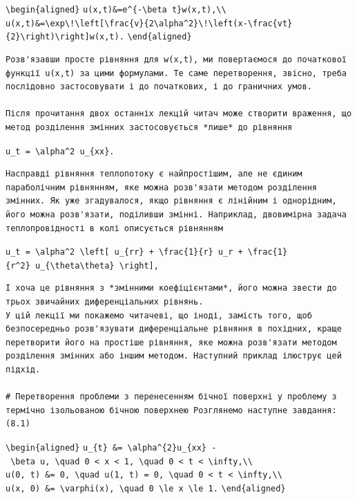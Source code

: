\documentclass[
  ukrainian,
]{article}
\begin{document}
\texttt{\textbackslash{}begin\{aligned\}}
\texttt{u(x,t)\&=e\^{}\{-\textbackslash{}beta\ t\}w(x,t),\textbackslash{}\textbackslash{}}
\texttt{u(x,t)\&=\textbackslash{}exp\textbackslash{}!\textbackslash{}left{[}\textbackslash{}frac\{v\}\{2\textbackslash{}alpha\^{}2\}\textbackslash{}!\textbackslash{}left(x-\textbackslash{}frac\{vt\}\{2\}\textbackslash{}right)\textbackslash{}right{]}w(x,t).}
\texttt{\textbackslash{}end\{aligned\}}

\begin{verbatim}
Розв'язавши просте рівняння для w(x,t), ми повертаємося до початкової функції u(x,t) за цими формулами. Те саме перетворення, звісно, треба послідовно застосовувати і до початкових, і до граничних умов.

Після прочитання двох останніх лекцій читач може створити враження, що метод розділення змінних застосовується *лише* до рівняння
\end{verbatim}

\texttt{u\_t\ =\ \textbackslash{}alpha\^{}2\ u\_\{xx\}.}

\begin{verbatim}
Насправді рівняння теплопотоку є найпростішим, але не єдиним параболічним рівнянням, яке можна розв'язати методом розділення змінних. Як уже згадувалося, якщо рівняння є лінійним і однорідним, його можна розв'язати, поділивши змінні. Наприклад, двовимірна задача теплопровідності в колі описується рівнянням
\end{verbatim}

\texttt{u\_t\ =\ \textbackslash{}alpha\^{}2\ \textbackslash{}left{[}\ u\_\{rr\}\ +\ \textbackslash{}frac\{1\}\{r\}\ u\_r\ +\ \textbackslash{}frac\{1\}\{r\^{}2\}\ u\_\{\textbackslash{}theta\textbackslash{}theta\}\ \textbackslash{}right{]},}

\begin{verbatim}
І хоча це рівняння з *змінними коефіцієнтами*, його можна звести до трьох звичайних диференціальних рівнянь.
У цій лекції ми покажемо читачеві, що іноді, замість того, щоб безпосередньо розв'язувати диференціальне рівняння в похідних, краще перетворити його на простіше рівняння, яке можна розв'язати методом розділення змінних або іншим методом. Наступний приклад ілюструє цей підхід.

# Перетворення проблеми з перенесенням бічної поверхні у проблему з термічно ізольованою бічною поверхнею Розглянемо наступне завдання:
(8.1)
\end{verbatim}

\texttt{\textbackslash{}begin\{aligned\}}
\texttt{u\_\{t\}\ \&=\ \textbackslash{}alpha\^{}\{2\}u\_\{xx\}\ -\ \textbackslash{}beta\ u,\ \textbackslash{}quad\ 0\ \textless{}\ x\ \textless{}\ 1,\ \textbackslash{}quad\ 0\ \textless{}\ t\ \textless{}\ \textbackslash{}infty,\textbackslash{}\textbackslash{}}
\texttt{u(0,\ t)\ \&=\ 0,\ \textbackslash{}quad\ u(1,\ t)\ =\ 0,\ \textbackslash{}quad\ 0\ \textless{}\ t\ \textless{}\ \textbackslash{}infty,\textbackslash{}\textbackslash{}}
\texttt{u(x,\ 0)\ \&=\ \textbackslash{}varphi(x),\ \textbackslash{}quad\ 0\ \textbackslash{}le\ x\ \textbackslash{}le\ 1.}
\texttt{\textbackslash{}end\{aligned\}}
\end{document}
